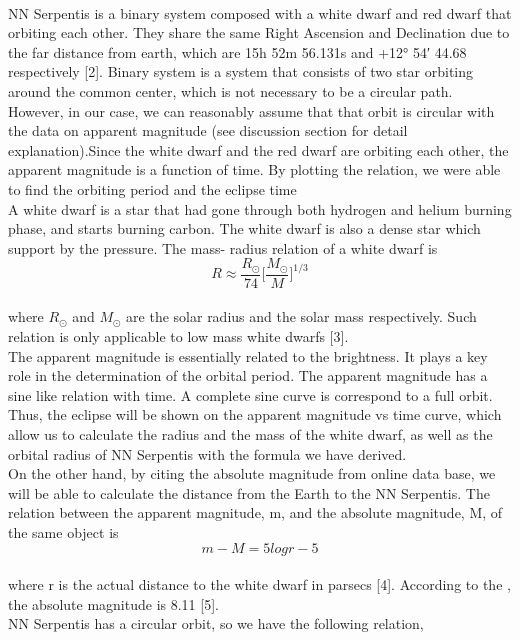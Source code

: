 \documentclass[10pt,journal,compsoc]{IEEEtran}
\begin{document}
\IEEEPARstart
 {}
\\NN Serpentis is a binary system composed with a white dwarf and red dwarf that orbiting each other. They share the same  Right Ascension and Declination due to the far distance from earth, which are 15h 52m 56.131s and +12° 54′ 44.68 respectively [2]. Binary system is a system that consists of two star orbiting around the common center, which is not necessary to be a circular path. However, in our case, we can reasonably assume that that orbit is circular with the data on apparent magnitude (see discussion section for detail explanation).Since the white dwarf and the red dwarf are orbiting each other, the apparent magnitude is a function of time. By plotting the relation, we were able to find the orbiting period and the eclipse time
\\A white dwarf is a star that had gone through both hydrogen and helium burning phase, and starts burning carbon. The white dwarf is also a dense star which support by the pressure. The mass- radius relation of a white dwarf is \begin{equation}
R\approx\frac{R_\odot}{74}\Big[\frac{M_\odot}{M}\Big]^{1/3}
\end{equation}
\\where $R_\odot$ and $M_\odot$ are the solar radius and the solar mass respectively. Such relation is only applicable to low mass white dwarfs [3].
\\The apparent magnitude is essentially related to the brightness. It plays a key role in the determination of the orbital period. The apparent magnitude has a sine like relation with time. A complete sine curve is correspond to a full orbit. Thus, the eclipse will be shown on the apparent magnitude vs time curve, which allow us to calculate the radius and the mass of the white dwarf, as well as the orbital radius of NN Serpentis with the formula we have derived.
\\On the other hand, by citing the absolute magnitude from online data base, we will be able to calculate the distance from the Earth to the NN Serpentis. The relation between the apparent magnitude, m, and the absolute magnitude, M, of the same object is 
\begin{equation}
m - M = 5logr - 5
\end{equation} 
\\where r is the actual distance to the white dwarf in parsecs [4]. According to the , the absolute magnitude is 8.11 [5].
\\NN Serpentis has a circular orbit, so we have the following relation,
\end{document}
